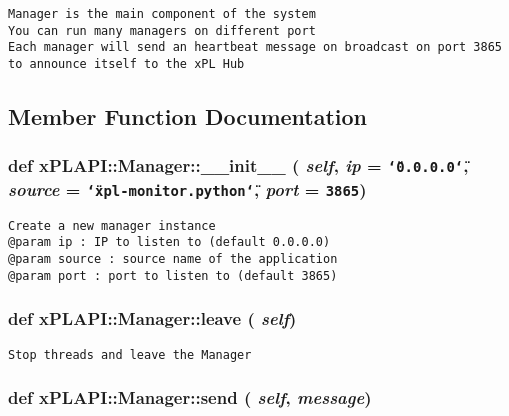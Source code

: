 \footnotesize\begin{verbatim}
Manager is the main component of the system
You can run many managers on different port
Each manager will send an heartbeat message on broadcast on port 3865
to announce itself to the xPL Hub
\end{verbatim}
\normalsize
 

\subsection{Member Function Documentation}
\hypertarget{classxPLAPI_1_1Manager_57252f423d02495f598f858e9c699d38}{
\subsubsection[\_\-\_\-init\_\-\_\-]{\setlength{\rightskip}{0pt plus 5cm}def xPLAPI::Manager::\_\-\_\-init\_\-\_\- ( {\em self}, \/   {\em ip} = {\tt \char`\"{}0.0.0.0\char`\"{}}, \/   {\em source} = {\tt \char`\"{}xpl-monitor.python\char`\"{}}, \/   {\em port} = {\tt 3865})}}
\label{classxPLAPI_1_1Manager_57252f423d02495f598f858e9c699d38}




\footnotesize\begin{verbatim}
Create a new manager instance
@param ip : IP to listen to (default 0.0.0.0)
@param source : source name of the application
@param port : port to listen to (default 3865)
\end{verbatim}
\normalsize
 \hypertarget{classxPLAPI_1_1Manager_c955c61a27cc1b91885632576bf2c13d}{
\subsubsection[leave]{\setlength{\rightskip}{0pt plus 5cm}def xPLAPI::Manager::leave ( {\em self})}}
\label{classxPLAPI_1_1Manager_c955c61a27cc1b91885632576bf2c13d}




\footnotesize\begin{verbatim}
Stop threads and leave the Manager
\end{verbatim}
\normalsize
 \hypertarget{classxPLAPI_1_1Manager_98293b52fe5999a6bdfbe1cf17d08eb7}{
\subsubsection[send]{\setlength{\rightskip}{0pt plus 5cm}def xPLAPI::Manager::send ( {\em self}, \/   {\em message})}}
\label{classxPLAPI_1_1Manager_98293b52fe5999a6bdfbe1cf17d08eb7}




